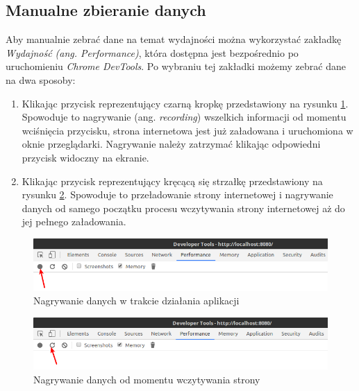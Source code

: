 \documentclass[polish, twoside, 12pt]{mwart}
\begin{document}
\subsection{Manualne zbieranie danych}
Aby manualnie zebrać dane na temat wydajności można wykorzystać zakładkę \emph{Wydajność (ang. Performance)}, która dostępna jest bezpośrednio po uruchomieniu \emph{Chrome DevTools}. Po wybraniu tej zakładki możemy zebrać dane na dwa sposoby:

\begin{enumerate}
  \item Klikając przycisk reprezentujący czarną kropkę przedstawiony na rysunku \ref{fig:chrome-devtools-performance-recording-runtime}. Spowoduje to nagrywanie (ang. \emph{recording}) wszelkich informacji od momentu wciśnięcia przycisku, strona internetowa jest już załadowana i uruchomiona w oknie przeglądarki. Nagrywanie należy zatrzymać klikając odpowiedni przycisk widoczny na ekranie. 
  \item Klikając przycisk reprezentujący kręcącą się strzałkę przedstawiony na rysunku \ref{fig:chrome-devtools-performance-recording-reload}. Spowoduje to przeładowanie strony internetowej i nagrywanie danych od samego początku procesu wczytywania strony internetowej aż do jej pełnego załadowania.
\end{enumerate}

\begin{figure}[ht]
  \includegraphics[width=\textwidth]{chrome-devtools-performance-recording-runtime.png}
  \caption{Nagrywanie danych w trakcie działania aplikacji}
  \label{fig:chrome-devtools-performance-recording-runtime}
\end{figure} 

\begin{figure}[ht]
  \includegraphics[width=\textwidth]{chrome-devtools-performance-recording-reload.png}
  \caption{Nagrywanie danych od momentu wczytywania strony}
  \label{fig:chrome-devtools-performance-recording-reload}
\end{figure}
\end{document}
